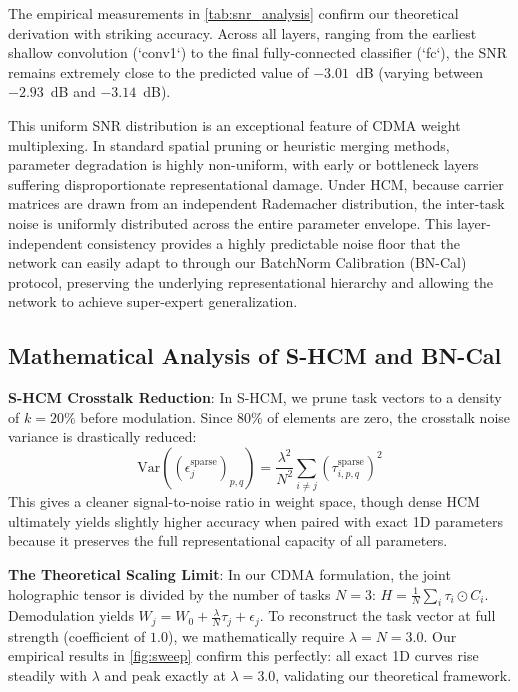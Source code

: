\documentclass{article}
\begin{document}
The empirical measurements in \cref{tab:snr_analysis} confirm our theoretical derivation with striking accuracy. Across all layers, ranging from the earliest shallow convolution (`conv1`) to the final fully-connected classifier (`fc`), the SNR remains extremely close to the predicted value of $-3.01$~dB (varying between $-2.93$~dB and $-3.14$~dB). 

This uniform SNR distribution is an exceptional feature of CDMA weight multiplexing. In standard spatial pruning or heuristic merging methods, parameter degradation is highly non-uniform, with early or bottleneck layers suffering disproportionate representational damage. Under HCM, because carrier matrices are drawn from an independent Rademacher distribution, the inter-task noise is uniformly distributed across the entire parameter envelope. This layer-independent consistency provides a highly predictable noise floor that the network can easily adapt to through our BatchNorm Calibration (BN-Cal) protocol, preserving the underlying representational hierarchy and allowing the network to achieve super-expert generalization.

\subsection{Mathematical Analysis of S-HCM and BN-Cal}
\textbf{S-HCM Crosstalk Reduction}: In S-HCM, we prune task vectors to a density of $k=20\%$ before modulation. Since $80\%$ of elements are zero, the crosstalk noise variance is drastically reduced:
\begin{equation}
    \text{Var}((\epsilon_j^{\text{sparse}})_{p, q}) = \frac{\lambda^2}{N^2} \sum_{i \neq j} (\tau_{i, p, q}^{\text{sparse}})^2
\end{equation}
This gives a cleaner signal-to-noise ratio in weight space, though dense HCM ultimately yields slightly higher accuracy when paired with exact 1D parameters because it preserves the full representational capacity of all parameters.

\textbf{The Theoretical Scaling Limit}: In our CDMA formulation, the joint holographic tensor is divided by the number of tasks $N=3$: $H = \frac{1}{N} \sum_i \tau_i \odot C_i$. Demodulation yields $W_j = W_0 + \frac{\lambda}{N} \tau_j + \epsilon_j$. To reconstruct the task vector at full strength (coefficient of $1.0$), we mathematically require $\lambda = N = 3.0$. Our empirical results in \cref{fig:sweep} confirm this perfectly: all exact 1D curves rise steadily with $\lambda$ and peak exactly at $\lambda = 3.0$, validating our theoretical framework.
\end{document}
